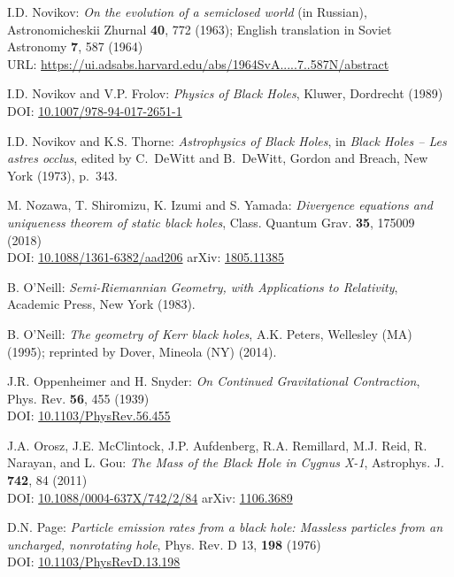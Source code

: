 \begin{thebibliography}{123}
I.D. Novikov:
{\em On the evolution of a semiclosed world} (in Russian),
Astronomicheskii Zhurnal {\bf 40}, 772 (1963); English translation in
Soviet Astronomy {\bf 7}, 587 (1964)\\
URL: \url{https://ui.adsabs.harvard.edu/abs/1964SvA.....7..587N/abstract}

I.D. Novikov and V.P. Frolov: {\em Physics of Black Holes},
Kluwer, Dordrecht (1989)\\
DOI: \href{https://doi.org/10.1007/978-94-017-2651-1}{10.1007/978-94-017-2651-1}

I.D. Novikov and K.S. Thorne: {\em Astrophysics of Black Holes},
in {\em Black Holes -- Les astres occlus},  edited by C.~DeWitt and B.~DeWitt,
Gordon and Breach, New York (1973), p.~343.

M. Nozawa, T. Shiromizu, K. Izumi and S. Yamada:
{\em Divergence equations and uniqueness theorem of static black holes},
Class. Quantum Grav. {\bf 35}, 175009 (2018)\\
DOI: \href{https://doi.org/10.1088/1361-6382/aad206}{10.1088/1361-6382/aad206}\hfill
arXiv: \href{https://arxiv.org/abs/1805.11385}{1805.11385}

B. O'Neill: {\em Semi-Riemannian Geometry, with Applications to Relativity},
Academic Press, New York (1983).

B. O'Neill: {\em The geometry of Kerr black holes}, A.K. Peters, Wellesley (MA) (1995);
reprinted by Dover, Mineola (NY) (2014).

J.R. Oppenheimer and H. Snyder:
{\em On Continued Gravitational Contraction},
Phys. Rev. {\bf 56}, 455 (1939)\\
DOI: \href{https://doi.org/10.1103/PhysRev.56.455}{10.1103/PhysRev.56.455}

J.A. Orosz, J.E. McClintock, J.P. Aufdenberg, R.A. Remillard, M.J. Reid, R. Narayan, and L. Gou:
{\em The Mass of the Black Hole in Cygnus X-1},
Astrophys. J. {\bf 742}, 84 (2011)\\
DOI: \href{https://doi.org/10.1088/0004-637X/742/2/84}{10.1088/0004-637X/742/2/84}\hfill
arXiv: \href{https://arxiv.org/abs/1106.3689}{1106.3689}

D.N. Page:
{\em Particle emission rates from a black hole: Massless particles from an uncharged, nonrotating hole},
Phys. Rev. D 13, {\bf 198} (1976)\\
DOI: \href{https://doi.org/10.1103/PhysRevD.13.198}{10.1103/PhysRevD.13.198}


\end{thebibliography}
